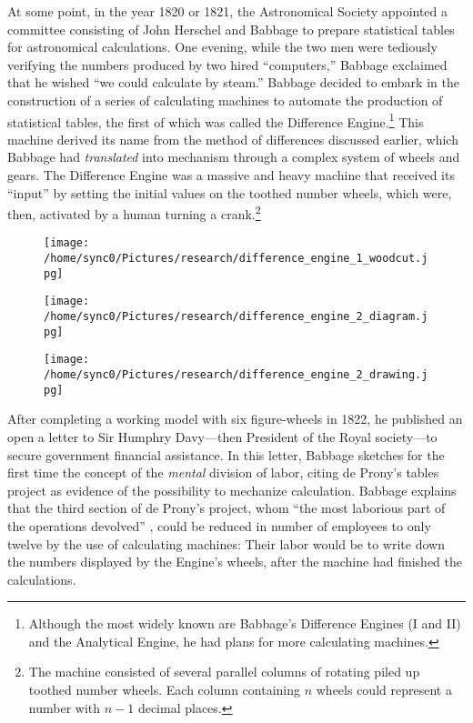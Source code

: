 \documentclass[version=last,draft=false,paper=A4,portrait,twoside=true,twocolumn=false,headinclude=false,footinclude=false,fontsize=12,BCOR=20mm,DIV=calc,pagesize=auto,titlepage=firstiscover,mpinclude=false,open=right,chapterprefix=true,numbers=autoendperiod,headsepline=false,headings=twolinechapter,parskip=false]{scrbook}
\begin{document}
At some point, in the year 1820 or 1821, the Astronomical Society appointed
a committee consisting of John Herschel and Babbage to prepare statistical
tables for astronomical calculations. One evening, while the two men were
tediously verifying the numbers produced by two hired ``computers,''
Babbage exclaimed that he wished ``we could calculate by steam.'' Babbage
decided to embark in the construction of a series of calculating machines
to automate the production of statistical tables, the first of which was
called the Difference Engine.\footnote{Although the most widely known are Babbage's Difference Engines (I
and II) and the Analytical Engine, he had plans for more calculating
machines.} This machine derived its name from the
method of differences discussed earlier, which Babbage had \emph{translated} into
mechanism through a complex system of wheels and gears. The Difference
Engine was a massive and heavy machine that received its ``input'' by
setting the initial values on the toothed number wheels, which were, then,
activated by a human turning a crank.\footnote{The machine consisted of several parallel columns of rotating piled
up toothed number wheels. Each column containing \(n\) wheels could represent
a number with  \(n - 1\) decimal places.}

\begin{figure}[htbp]
\centering
\texttt{[image: /home/sync0/Pictures/research/difference\_engine\_1\_woodcut.jpg]}
\end{figure}

\begin{figure}[htbp]
\centering
\texttt{[image: /home/sync0/Pictures/research/difference\_engine\_2\_diagram.jpg]}
\end{figure}

\begin{figure}[htbp]
\centering
\texttt{[image: /home/sync0/Pictures/research/difference\_engine\_2\_drawing.jpg]}
\end{figure}


After completing a working model with six figure-wheels in 1822, he
published an open a letter to Sir Humphry Davy---then President of the
Royal society---to secure government financial assistance. In this letter,
Babbage sketches for the first time the concept of the \emph{mental} division of
labor, citing de Prony's tables project as evidence of the possibility to
mechanize calculation. Babbage explains that the third section of de
Prony's project, whom ``the most laborious part of the operations
devolved'' \autocite[214]{babbage1822}, could be reduced in number of
employees to only twelve by the use of calculating machines: Their labor
would be to write down the numbers displayed by the Engine's wheels, after
the machine had finished the calculations.
\end{document}
